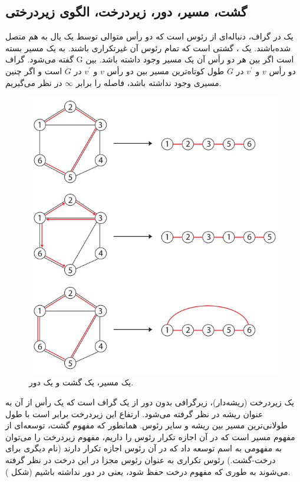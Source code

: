 \subsection{گشت، مسیر، دور، زیردرخت، الگوی زیردرختی}
یک  در گراف، دنباله‌ای از رئوس است که دو رأس متوالی توسط یک یال به هم متصل شده‌باشند. یک ، گشتی است که تمام رئوس آن غیرتکراری باشند. به یک مسیر بسته  گفته می‌شود. گراف G  است اگر بین هر دو رأس آن یک مسیر وجود داشته باشد.  بین دو رأس $v$ و $v^\prime$ در $G$ طول کوتاه‌ترین مسیر بین دو رأس $v$ و $v^\prime$ در $G$ است و اگر چنین مسیری وجود نداشته باشد، فاصله را برابر $\infty$ در نظر می‌گیریم.

 
\begin{figure}[ht]
\centering
\includegraphics[scale=0.5]{./walk-path-cycle.png}
\caption{یک مسیر، یک گشت و یک دور.}
\label{fig:walk-path-cycle}
\end{figure}

یک زیردرخت (ریشه‌دار)، زیرگرافی بدون دور از یک گراف است که یک رأس از آن به عنوان ریشه در نظر گرفته می‌شود. ارتفاع این زیردرخت برابر است با طول طولانی‌ترین مسیر بین ریشه و سایر رئوس. همانطور که مفهوم گشت، توسعه‌ای از مفهوم مسیر است که در آن اجازه تکرار رئوس را داریم، مفهوم زیردرخت را می‌توان به مفهومی به اسم  توسعه داد که در آن رئوس اجازه تکرار دارند (نام دیگری برای درخت-گشت‌.) رئوس تکراری به عنوان رئوس مجزا در این درخت در نظر گرفته می‌شوند به طوری که مفهوم درخت حفظ شود، یعنی در دور نداشته باشیم (شکل ).

